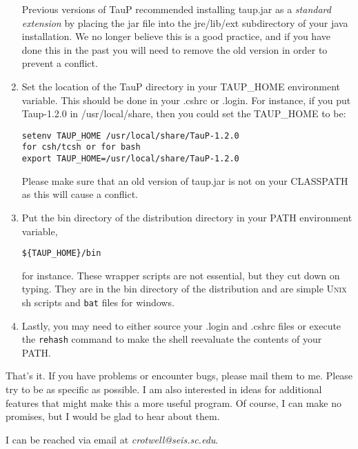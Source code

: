 \begin{enumerate}
Previous versions of TauP recommended installing taup.jar as a \textit{standard extension} by placing the jar file into the jre/lib/ext subdirectory of your java installation. We no longer believe this is a good
practice, and if you have done this in the past you will need to remove the old version in order to
prevent a conflict.

\item Set the location of the TauP directory in your TAUP\_HOME environment variable.
This should be done in your .cshrc or .login. For instance, if you put Taup-1.2.0 in
/usr/local/share, then you could set the TAUP\_HOME to be:
\begin{verbatim}
setenv TAUP_HOME /usr/local/share/TauP-1.2.0
for csh/tcsh or for bash
export TAUP_HOME=/usr/local/share/TauP-1.2.0
\end{verbatim} 

Please make sure that an old version of taup.jar is not on your CLASSPATH as this will cause a 
conflict.

\item Put the bin directory of the distribution directory in your PATH environment
variable, \begin{verbatim}${TAUP_HOME}/bin\end{verbatim} for instance. These wrapper 
scripts are not essential, but they cut down on 
typing. They are in the bin directory of the distribution 
and are simple \textsc{Unix} sh scripts and \texttt{bat} files for windows.

\item Lastly, you may need to either source your .login and .cshrc files or
execute the \texttt{rehash} command to make the shell reevaluate the 
contents of your PATH.

\end{enumerate}

That's it. If you have problems or encounter bugs, please mail them to me.
Please try to be as specific as possible. I am also interested in ideas for
additional features that might make this a more useful program. 
Of course, I can make no promises,
but I would be glad to hear about them.

I can be reached via email at \textit{crotwell@seis.sc.edu}.

